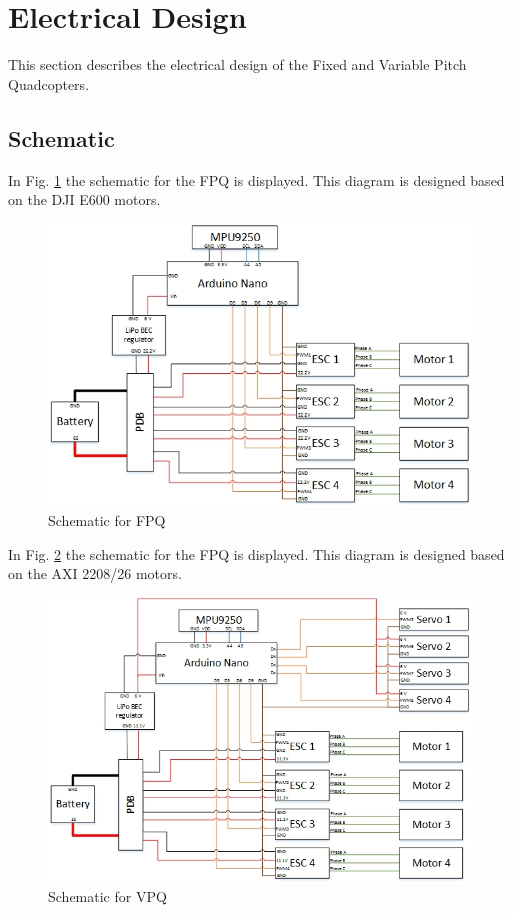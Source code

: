 \section{Electrical Design}
This section describes the electrical design of the Fixed and Variable Pitch Quadcopters.

\subsection{Schematic}
In Fig. \ref{fig:fpqsch} the schematic for the FPQ is displayed. This diagram is designed based on the DJI E600 motors. 
\begin{figure}[H]
    \centering
    \includegraphics[width = 1\textwidth]{VAPIQ-PICTURES/ShematicFPQ}
    \caption{Schematic for FPQ}
    \label{fig:fpqsch}
\end{figure}
\newpage
\noindent
In Fig. \ref{fig:vpqsch} the schematic for the FPQ is displayed. This diagram is designed based on the AXI 2208/26 motors. 
\begin{figure}[H]
    \centering
    \includegraphics[width = 1\textwidth]{VAPIQ-PICTURES/ShematicVPQ}
    \caption{Schematic for VPQ}
    \label{fig:vpqsch}
\end{figure}
\newpage
